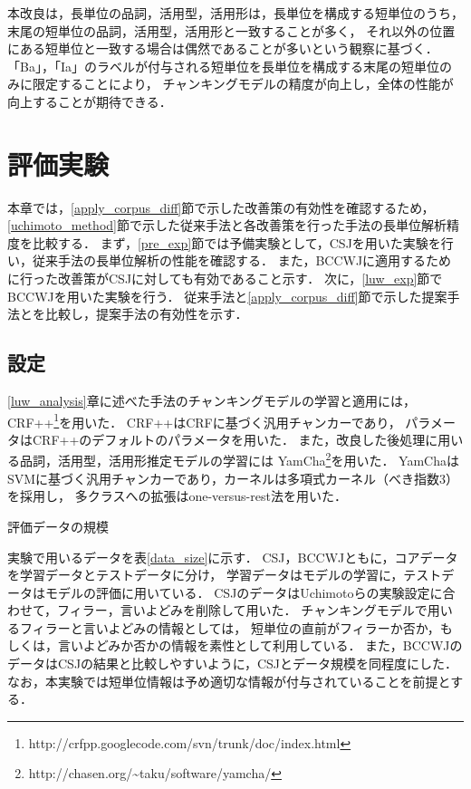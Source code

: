 \documentclass[japanese]{jnlp_1.4}
\begin{document}
本改良は，長単位の品詞，活用型，活用形は，長単位を構成する短単位のうち，
末尾の短単位の品詞，活用型，活用形と一致することが多く，
それ以外の位置にある短単位と一致する場合は偶然であることが多いという観察に基づく．
「Ba」，「Ia」のラベルが付与される短単位を長単位を構成する末尾の短単位のみに限定することにより，
チャンキングモデルの精度が向上し，全体の性能が向上することが期待できる．


\section{評価実験}
\label{exp}

本章では，\ref{apply_corpus_diff}節で示した改善策の有効性を確認するため，
\ref{uchimoto_method}節で示した従来手法と各改善策を行った手法の長単位解析精度を比較する．
まず，\ref{pre_exp}節では予備実験として，CSJを用いた実験を行い，従来手法の長単位解析の性能を確認する．
また，BCCWJに適用するために行った改善策がCSJに対しても有効であること示す．
次に，\ref{luw_exp}節でBCCWJを用いた実験を行う．
従来手法と\ref{apply_corpus_diff}節で示した提案手法とを比較し，提案手法の有効性を示す．


\subsection{設定}
\label{exp_setting}

\ref{luw_analysis}章に述べた手法のチャンキングモデルの学習と適用には，
CRF++\footnote{http://crfpp.googlecode.com/svn/trunk/doc/index.html}を用いた．
CRF++はCRFに基づく汎用チャンカーであり，
パラメータはCRF++のデフォルトのパラメータを用いた．
また，改良した後処理に用いる品詞，活用型，活用形推定モデルの学習には
YamCha\footnote{http://chasen.org/{\textasciitilde}taku/software/yamcha/}を用いた．
YamChaはSVMに基づく汎用チャンカーであり，カーネルは多項式カーネル（べき指数3）を採用し，
多クラスへの拡張はone-versus-rest法を用いた．

\begin{table}[b]
\caption{評価データの規模}
\label{data_size}

\end{table}

実験で用いるデータを表\ref{data_size}に示す．
CSJ，BCCWJともに，コアデータを学習データとテストデータに分け，
学習データはモデルの学習に，テストデータはモデルの評価に用いている．
CSJのデータはUchimotoら\cite{uchimoto2007}の実験設定に合わせて，フィラー，言いよどみを削除して用いた．
チャンキングモデルで用いるフィラーと言いよどみの情報としては，
短単位の直前がフィラーか否か，もしくは，言いよどみか否かの情報を素性として利用している．
また，BCCWJのデータはCSJの結果と比較しやすいように，CSJとデータ規模を同程度にした．
なお，本実験では短単位情報は予め適切な情報が付与されていることを前提とする．
\end{document}
